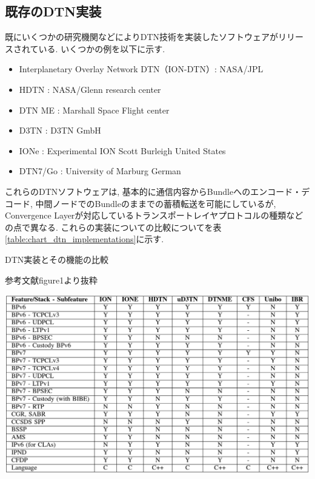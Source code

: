 \subsection{既存のDTN実装}
\label{section:既存のDTN実装}
既にいくつかの研究機関などによりDTN技術を実装したソフトウェアがリリースされている.  いくつかの例を以下に示す.  
\begin{itemize}
    \item Interplanetary Overlay Network DTN（ION-DTN）: NASA/JPL
    \item HDTN : NASA/Glenn research center
    \item DTN ME : Marshall Space Flight center
    \item \textmu D3TN : D3TN GmbH
    \item IONe : Experimental ION Scott Burleigh United States 
    \item DTN7/Go : University of Marburg German
\end{itemize}
これらのDTNソフトウェアは,  基本的に通信内容からBundleへのエンコード・デコード,  
中間ノードでのBundleのままでの蓄積転送を可能にしているが,  
Convergence Layerが対応しているトランスポートレイヤプロトコルの種類などの点で異なる. 
これらの実装についての比較についてを表\ref{table:chart_dtn_implementations}に示す. 

\begin{table}[tbh]
    \centering
    \caption{DTN実装とその機能の比較}
    \begin{minipage}[t]{\textwidth}
        \centering
        \fontsize{10.5pt}{12pt}\selectfont
        参考文献\cite{dtn_implementations}figure1より抜粋
        \vspace{3mm}
    \end{minipage}
    \includegraphics[width=0.7\textheight]{img/chart_dtn_implementations.pdf}
    \label{table:chart_dtn_implementations}
\end{table}